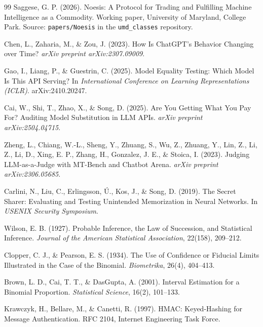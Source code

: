 %

\begin{thebibliography}{99}
   Saggese, G. P. (2026). Noesis: A Protocol for
    Trading and Fulfilling Machine Intelligence as a Commodity. Working paper,
    University of Maryland, College Park. Source: \texttt{papers/Noesis} in the
    \texttt{umd\_classes} repository.

   Chen, L., Zaharia, M., \& Zou, J. (2023). How Is
    ChatGPT's Behavior Changing over Time? \textit{arXiv preprint
    arXiv:2307.09009}.

   Gao, I., Liang, P., \& Guestrin, C. (2025). Model
    Equality Testing: Which Model Is This API Serving? In \textit{International
    Conference on Learning Representations (ICLR)}. arXiv:2410.20247.

   Cai, W., Shi, T., Zhao, X., \& Song, D. (2025).
    Are You Getting What You Pay For? Auditing Model Substitution in LLM APIs.
    \textit{arXiv preprint arXiv:2504.04715}.

   Zheng, L., Chiang, W.-L., Sheng, Y., Zhuang, S.,
    Wu, Z., Zhuang, Y., Lin, Z., Li, Z., Li, D., Xing, E. P., Zhang, H.,
    Gonzalez, J. E., \& Stoica, I. (2023). Judging LLM-as-a-Judge with MT-Bench
    and Chatbot Arena. \textit{arXiv preprint arXiv:2306.05685}.

   Carlini, N., Liu, C., Erlingsson, \'U., Kos, J.,
    \& Song, D. (2019). The Secret Sharer: Evaluating and Testing Unintended
    Memorization in Neural Networks. In \textit{USENIX Security Symposium}.

   Wilson, E. B. (1927). Probable Inference, the Law of
    Succession, and Statistical Inference. \textit{Journal of the American
    Statistical Association}, 22(158), 209--212.

   Clopper, C. J., \& Pearson, E. S. (1934). The Use of
    Confidence or Fiducial Limits Illustrated in the Case of the Binomial.
    \textit{Biometrika}, 26(4), 404--413.

   Brown, L. D., Cai, T. T., \& DasGupta, A. (2001). Interval
    Estimation for a Binomial Proportion. \textit{Statistical Science}, 16(2),
    101--133.

   Krawczyk, H., Bellare, M., \& Canetti, R. (1997). HMAC:
    Keyed-Hashing for Message Authentication. RFC 2104, Internet Engineering
    Task Force.
\end{thebibliography}
